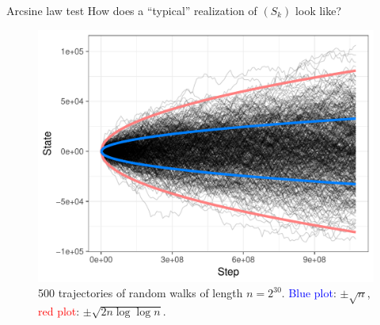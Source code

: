 \documentclass[aspectratio=169]{beamer}
\begin{document}
%




\begin{frame}{Arcsine law test}
How does a ``typical'' realization of  $(S_k)$ look like?

\begin{figure}[h]
\centering
\includegraphics[scale=0.3]{figures/trajectories_6x8.pdf}
\caption{500 trajectories of random walks of length $n=2^{30}$.
\textcolor{blue}{Blue plot}: $\pm \sqrt{n}$, \textcolor{red}{red plot}: $\pm \sqrt{2n\log\log n}$.}\label{fig:500iter}
\end{figure}


\end{frame}
\end{document}

